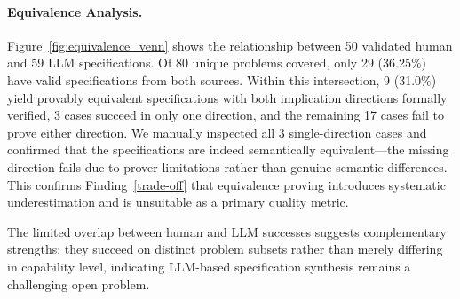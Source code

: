
\paragraph{Equivalence Analysis.}


Figure~\ref{fig:equivalence_venn} shows the relationship between 50 validated human and 59 LLM specifications. Of 80 unique problems covered, only 29 (36.25\%) have valid specifications from both sources. Within this intersection, 9 (31.0\%) yield provably equivalent specifications with both implication directions formally verified, 3 cases succeed in only one direction, and the remaining 17 cases fail to prove either direction. We manually inspected all 3 single-direction cases and confirmed that the specifications are indeed semantically equivalent—the missing direction fails due to prover limitations rather than genuine semantic differences. This confirms Finding~\ref{trade-off} that equivalence proving introduces systematic underestimation and is unsuitable as a primary quality metric.

The limited overlap between human and LLM successes suggests complementary strengths: they succeed on distinct problem subsets rather than merely differing in capability level, indicating LLM-based specification synthesis remains a challenging open problem.
